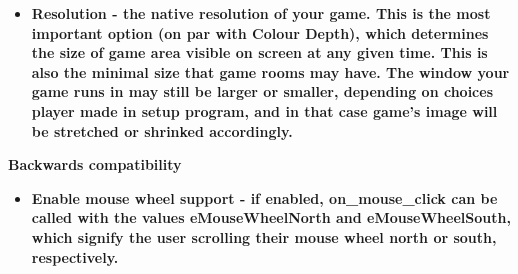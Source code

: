 \begin{itemize}
\item \bf{Resolution} - the native resolution of your game. This is the most important option (on par with Colour Depth), which determines the size of game area visible on screen at any given time. This is also the minimal size that game rooms may have.
The window your game runs in may still be larger or smaller, depending on choices player made in setup program, and in that case game's image will be stretched or shrinked accordingly.
\end{itemize}

\bf{Backwards compatibility}
\begin{itemize}
\item \bf{Enable mouse wheel support} - if enabled, on_mouse_click can be called with
the values eMouseWheelNorth and eMouseWheelSouth, which signify the user scrolling their mouse
wheel north or south, respectively.


\end{itemize}
